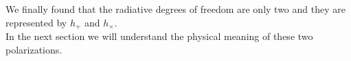 We finally found that the radiative degrees of freedom are only two and they are represented by $h_{+}$ and $h_{\times}$. \\
In the next section we will understand the physical meaning of these two polarizations.
\\
\begin{comment}
Generally, within any finite vacuum region it is always possible to find a gauge which is locally TT, that is, a guage which satisfies the general conditions of the \textbf{Transverse Traceless gauge}%
\bea
h_{0 \nu} ^{\T} = 0 \\
\eta ^{\mu \nu} h_{\mu \nu} ^{\T} =0 \\
\partial_{\mu} h^{\mu \nu} _{\T} =0
\eea
\end{comment}
 


